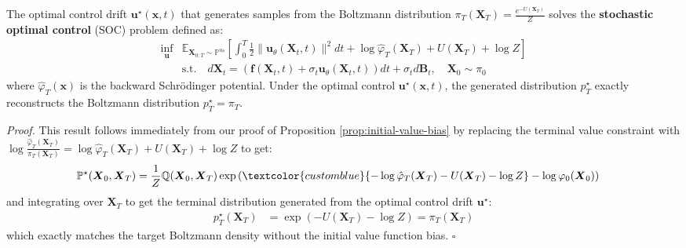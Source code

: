 \documentclass{article}
\newcommand{\bluetext}[1]{\textcolor{customblue}{#1}}
\begin{document}
\begin{proposition}\label{prop:soc-sampling-boltzmann}
    The optimal control drift $\boldsymbol{u}^\star(\boldsymbol{x},t)$ that generates samples from the Boltzmann distribution $\pi_T(\boldsymbol{X}_T)= \frac{e^{-U(\boldsymbol{X}_T)}}{Z}$ solves the \textbf{stochastic optimal control} (SOC) problem defined as:
    \begin{align}
        \inf_{\boldsymbol{u}}&\mathbb{E}_{\boldsymbol{X}_{0:T}\sim \mathbb{P}^{u_\theta}}\left[\int_0^T\frac{1}{2}\|\boldsymbol{u}_\theta(\boldsymbol{X}_t,t)\|^2dt+\log\hat\varphi_T(\boldsymbol{X}_T)+U(\boldsymbol{X}_T)+\log Z\right]\label{eq:bolzmann-sb-soc}\\
        &\text{s.t.}\quad d\boldsymbol{X}_t=(\boldsymbol{f}(\boldsymbol{X}_t,t)+\sigma_t\boldsymbol{u}_\theta(\boldsymbol{X}_t,t))dt+\sigma_td\boldsymbol{B}_t, \quad \boldsymbol{X}_0\sim \pi_0\nonumber
    \end{align}
    where $\hat\varphi_T(\boldsymbol{x})$ is the backward Schrödinger potential. Under the optimal control $\boldsymbol{u}^\star(\boldsymbol{x},t)$, the generated distribution $p^\star_T$ exactly reconstructs the Boltzmann distribution $p_T^\star=\pi_T$.
\end{proposition}

\textit{Proof.} This result follows immediately from our proof of Proposition \ref{prop:initial-value-bias} by replacing the terminal value constraint with $\log \frac{\hat{\varphi}_T(\boldsymbol{X}_T)}{\pi_T(\boldsymbol{X}_T)}=\log\hat\varphi_T(\boldsymbol{X}_T)+U(\boldsymbol{X}_T)+\log Z$ to get:
\begin{align}
    \mathbb{P}^\star(\boldsymbol{X}_0, \boldsymbol{X}_T)&=\frac{1}{Z}\mathbb{Q}(\boldsymbol{X}_0, \boldsymbol{X}_T)\exp\left(\bluetext{-\log\hat\varphi_T(\boldsymbol{X}_T)-U(\boldsymbol{X}_T)-\log Z}-\log \varphi_0(\boldsymbol{X}_0)\right)
\end{align}
and integrating over $\boldsymbol{X}_T$ to get the terminal distribution generated from the optimal control drift $\boldsymbol{u}^\star$:
\begin{align}
    p_T^\star(\boldsymbol{X}_T)&=\exp\left(-U(\boldsymbol{X}_T)-\log Z\right)=\pi_T(\boldsymbol{X}_T)
\end{align}
which exactly matches the target Boltzmann density without the initial value function bias. \hfill $\square$
\end{document}
